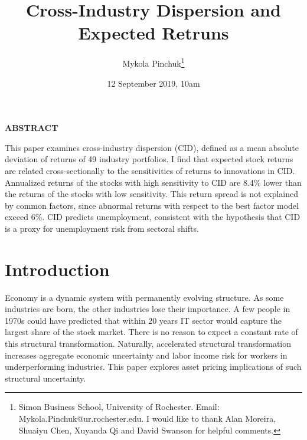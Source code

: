 \documentclass[12pt]{article}
\begin{document}
\onehalfspacing      %
\renewcommand{\footnote}{\endnote}  %

\author{\large{Mykola Pinchuk}\thanks{\rm Simon Business School, University of Rochester. Email: Mykola.Pinchuk@ur.rochester.edu. \newline I would like to thank Alan Moreira, Shuaiyu Chen, Xuyanda Qi and David Swanson for helpful comments.}}

\title{\Large \bf Cross-Industry Dispersion and Expected Retruns}

\date{12 September 2019, 10am}             %


\maketitle
\thispagestyle{empty}

\bigskip

\normalsize
\vspace{1cm}

\centerline{\bf ABSTRACT}

\vspace{0.5cm}

\begin{onehalfspace}  %
  \noindent This paper examines cross-industry dispersion (CID), defined as a mean absolute deviation of returns of 49 industry portfolios. I find that expected stock returns are related cross-sectionally to the sensitivities of returns to innovations in CID. Annualized returns of the stocks with high sensitivity to CID are 8.4\% lower than the returns of the stocks with low sensitivity. This return spread is not explained by common factors, since abnormal returns with respect to the best factor model exceed 6\%. CID predicts unemployment, consistent with the hypothesis that CID is a proxy for unemployment risk from sectoral shifts.
\end{onehalfspace}
\medskip


\clearpage
{}


\section{Introduction} \label{sec:Model}
Economy is a dynamic system with permanently evolving structure. As some industries are born, the other industries lose their importance. A few people in 1970s could have predicted that within 20 years IT sector would capture the largest share of the stock market. There is no reason to expect a constant rate of this structural transformation. Naturally, accelerated structural transformation increases aggregate economic uncertainty and labor income risk for workers in underperforming industries. This paper explores asset pricing implications of such structural uncertainty.
\end{document}
